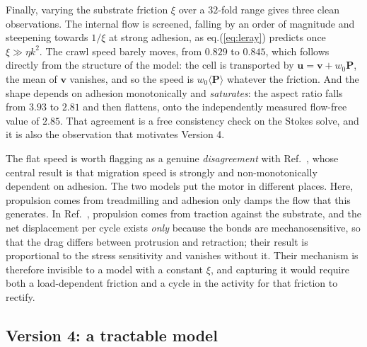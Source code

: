 \documentclass[11pt]{article}
\begin{document}
Finally, varying the substrate friction $\xi$ over a $32$-fold range gives three
clean observations. The internal flow is screened, falling by an order of
magnitude and steepening towards $1/\xi$ at strong adhesion, as
eq.(\ref{eq:leray}) predicts once $\xi\gg\eta k^{2}$. The crawl speed barely
moves, from $0.829$ to $0.845$, which follows directly from the structure of the
model: the cell is transported by $\mathbf{u}=\mathbf{v}+w_{0}\mathbf{P}$, the
mean of $\mathbf{v}$ vanishes, and so the speed is
$w_{0}\langle\mathbf{P}\rangle$ whatever the friction. And the shape depends on
adhesion monotonically and \textit{saturates}: the aspect ratio falls from $3.93$
to $2.81$ and then flattens, onto the independently measured flow-free value of
$2.85$. That agreement is a free consistency check on the Stokes solve, and it is
also the observation that motivates Version 4.

The flat speed is worth flagging as a genuine \textit{disagreement} with
Ref.~\cite{Leoni:2017}, whose central result is that migration speed is strongly
and non-monotonically dependent on adhesion. The two models put the motor in
different places. Here, propulsion comes from treadmilling and adhesion only
damps the flow that this generates. In Ref.~\cite{Leoni:2017}, propulsion comes
from traction against the substrate, and the net displacement per cycle exists
\textit{only} because the bonds are mechanosensitive, so that the drag differs
between protrusion and retraction; their result is proportional to the stress
sensitivity and vanishes without it. Their mechanism is therefore invisible to a
model with a constant $\xi$, and capturing it would require both a load-dependent
friction and a cycle in the activity for that friction to rectify.

\subsection{Version 4: a tractable model}
\label{sec:v4}
\end{document}
